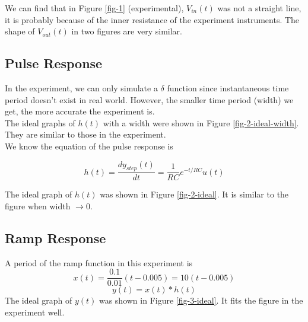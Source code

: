 \documentclass{article}
\begin{document}
We can find that in Figure \ref{fig-1} (experimental), $V_{in}(t)$ was not a straight line, it is probably because of the inner resistance of the experiment instruments. The shape of $V_{out}(t)$ in two figures are very similar.

\subsection{Pulse Response}
In the experiment, we can only simulate a $\delta$ function since instantaneous time period doesn't exist in real world. However, the smaller time period (width) we get, the more accurate the experiment is. \\

The ideal graphs of $h(t)$ with a width were shown in Figure \ref{fig-2-ideal-width}. They are similar to those in the experiment.\\



We know the equation of the pulse response is

$$h(t)=\frac{dy_{step}(t)}{dt}=\frac{1}{RC}e^{-t/RC}u(t)$$

The ideal graph of $h(t)$ was shown in Figure \ref{fig-2-ideal}. It is similar to the figure when width $\to 0$.


\newpage

\subsection{Ramp Response}

A period of the ramp function in this experiment is
$$x(t)=\frac{0.1}{0.01}(t-0.005)=10(t-0.005)$$
$$y(t)=x(t)*h(t)$$
The ideal graph of $y(t)$ was shown in Figure \ref{fig-3-ideal}. It fits the figure in the experiment well.
\end{document}
